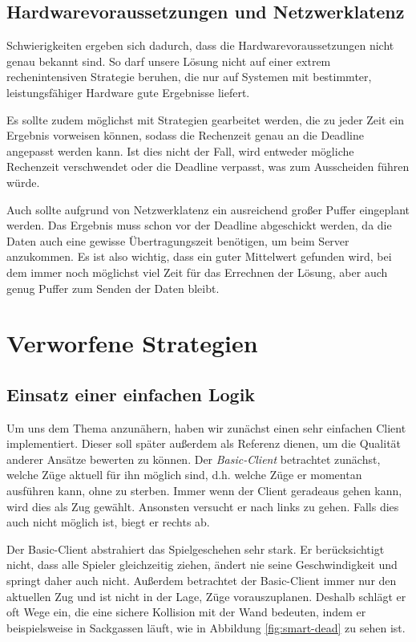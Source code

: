 \documentclass[12pt,a4paper]{article}
\begin{document}
\subsection{Hardwarevoraussetzungen und Netzwerklatenz}
Schwierigkeiten ergeben sich dadurch, dass die Hardwarevoraussetzungen nicht genau bekannt sind. So darf unsere Lösung nicht auf einer extrem rechenintensiven Strategie beruhen, die nur auf Systemen mit bestimmter, leistungsfähiger Hardware gute Ergebnisse liefert.

Es sollte zudem möglichst mit Strategien gearbeitet werden, die zu jeder Zeit ein Ergebnis vorweisen können, sodass die Rechenzeit genau an die Deadline angepasst werden kann. Ist dies nicht der Fall, wird entweder mögliche Rechenzeit verschwendet oder die Deadline verpasst, was zum Ausscheiden führen würde. 

Auch sollte aufgrund von Netzwerklatenz ein ausreichend großer Puffer eingeplant werden. Das Ergebnis muss schon vor der Deadline abgeschickt werden, da die Daten auch eine gewisse Übertragungszeit benötigen, um beim Server anzukommen. Es ist also wichtig, dass ein guter Mittelwert gefunden wird, bei dem immer noch möglichst viel Zeit für das Errechnen der Lösung, aber auch genug Puffer zum Senden der Daten bleibt.

\section{Verworfene Strategien}

\subsection{Einsatz einer einfachen Logik}
Um uns dem Thema anzunähern, haben wir zunächst einen sehr einfachen Client implementiert. Dieser soll später außerdem als Referenz dienen, um die Qualität anderer Ansätze bewerten zu können. Der \textit{Basic-Client} betrachtet zunächst, welche Züge aktuell für ihn möglich sind, d.h. welche Züge er momentan ausführen kann, ohne zu sterben. Immer wenn der Client geradeaus gehen kann, wird dies als Zug gewählt. Ansonsten versucht er nach links zu gehen. Falls dies auch nicht möglich ist, biegt er rechts ab.

Der Basic-Client abstrahiert das Spielgeschehen sehr stark. Er berücksichtigt nicht, dass alle Spieler gleichzeitig ziehen, ändert nie seine Geschwindigkeit und springt daher auch nicht. Außerdem betrachtet der Basic-Client immer nur den aktuellen Zug und ist nicht in der Lage, Züge vorauszuplanen. Deshalb schlägt er oft Wege ein, die eine sichere Kollision mit der Wand bedeuten, indem er beispielsweise in Sackgassen läuft, wie in Abbildung \ref{fig:smart-dead} zu sehen ist.
\end{document}

